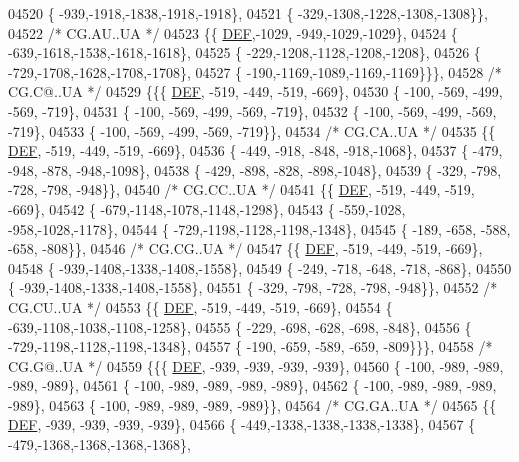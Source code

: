 \begin{DoxyCode}
04520 \{ -939,-1918,-1838,-1918,-1918\},
04521 \{ -329,-1308,-1228,-1308,-1308\}\},
04522 \textcolor{comment}{/* CG.AU..UA */}
04523 \{\{  \mbox{\hyperlink{1_88_84__epars_8h_a397419fc12b37ed479c8abb9d444d843}{DEF}},-1029, -949,-1029,-1029\},
04524 \{ -639,-1618,-1538,-1618,-1618\},
04525 \{ -229,-1208,-1128,-1208,-1208\},
04526 \{ -729,-1708,-1628,-1708,-1708\},
04527 \{ -190,-1169,-1089,-1169,-1169\}\}\},
04528 \textcolor{comment}{/* CG.C@..UA */}
04529 \{\{\{  \mbox{\hyperlink{1_88_84__epars_8h_a397419fc12b37ed479c8abb9d444d843}{DEF}}, -519, -449, -519, -669\},
04530 \{ -100, -569, -499, -569, -719\},
04531 \{ -100, -569, -499, -569, -719\},
04532 \{ -100, -569, -499, -569, -719\},
04533 \{ -100, -569, -499, -569, -719\}\},
04534 \textcolor{comment}{/* CG.CA..UA */}
04535 \{\{  \mbox{\hyperlink{1_88_84__epars_8h_a397419fc12b37ed479c8abb9d444d843}{DEF}}, -519, -449, -519, -669\},
04536 \{ -449, -918, -848, -918,-1068\},
04537 \{ -479, -948, -878, -948,-1098\},
04538 \{ -429, -898, -828, -898,-1048\},
04539 \{ -329, -798, -728, -798, -948\}\},
04540 \textcolor{comment}{/* CG.CC..UA */}
04541 \{\{  \mbox{\hyperlink{1_88_84__epars_8h_a397419fc12b37ed479c8abb9d444d843}{DEF}}, -519, -449, -519, -669\},
04542 \{ -679,-1148,-1078,-1148,-1298\},
04543 \{ -559,-1028, -958,-1028,-1178\},
04544 \{ -729,-1198,-1128,-1198,-1348\},
04545 \{ -189, -658, -588, -658, -808\}\},
04546 \textcolor{comment}{/* CG.CG..UA */}
04547 \{\{  \mbox{\hyperlink{1_88_84__epars_8h_a397419fc12b37ed479c8abb9d444d843}{DEF}}, -519, -449, -519, -669\},
04548 \{ -939,-1408,-1338,-1408,-1558\},
04549 \{ -249, -718, -648, -718, -868\},
04550 \{ -939,-1408,-1338,-1408,-1558\},
04551 \{ -329, -798, -728, -798, -948\}\},
04552 \textcolor{comment}{/* CG.CU..UA */}
04553 \{\{  \mbox{\hyperlink{1_88_84__epars_8h_a397419fc12b37ed479c8abb9d444d843}{DEF}}, -519, -449, -519, -669\},
04554 \{ -639,-1108,-1038,-1108,-1258\},
04555 \{ -229, -698, -628, -698, -848\},
04556 \{ -729,-1198,-1128,-1198,-1348\},
04557 \{ -190, -659, -589, -659, -809\}\}\},
04558 \textcolor{comment}{/* CG.G@..UA */}
04559 \{\{\{  \mbox{\hyperlink{1_88_84__epars_8h_a397419fc12b37ed479c8abb9d444d843}{DEF}}, -939, -939, -939, -939\},
04560 \{ -100, -989, -989, -989, -989\},
04561 \{ -100, -989, -989, -989, -989\},
04562 \{ -100, -989, -989, -989, -989\},
04563 \{ -100, -989, -989, -989, -989\}\},
04564 \textcolor{comment}{/* CG.GA..UA */}
04565 \{\{  \mbox{\hyperlink{1_88_84__epars_8h_a397419fc12b37ed479c8abb9d444d843}{DEF}}, -939, -939, -939, -939\},
04566 \{ -449,-1338,-1338,-1338,-1338\},
04567 \{ -479,-1368,-1368,-1368,-1368\},

\end{DoxyCode}
